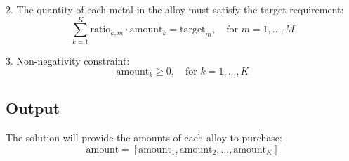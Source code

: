 \documentclass{article}
\begin{document}
2. The quantity of each metal in the alloy must satisfy the target requirement:
   \[
   \sum_{k=1}^{K} \text{ratio}_{k,m} \cdot \text{amount}_{k} = \text{target}_{m}, \quad \text{for } m = 1, \ldots, M
   \]

3. Non-negativity constraint:
   \[
   \text{amount}_{k} \geq 0, \quad \text{for } k = 1, \ldots, K
   \]

\subsection*{Output}
The solution will provide the amounts of each alloy to purchase:
\[
\text{amount} = [\text{amount}_{1}, \text{amount}_{2}, \ldots, \text{amount}_{K}]
\]
\end{document}
